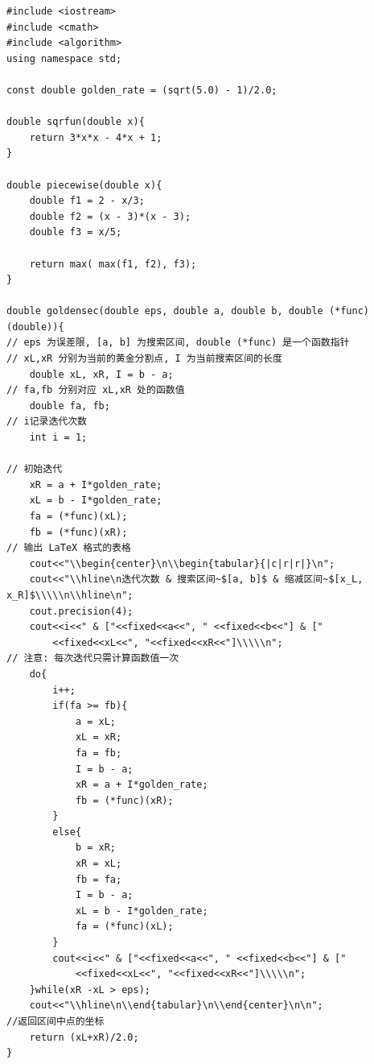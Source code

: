 \documentclass[a4paper,12pt]{article}
\begin{document}
\begin{CJK*}{UTF8}{gbsn}
\begin{lstlisting}[caption={黄金分割法}, label={goldensec}]
#include <iostream>
#include <cmath>
#include <algorithm>
using namespace std;

const double golden_rate = (sqrt(5.0) - 1)/2.0;

double sqrfun(double x){
    return 3*x*x - 4*x + 1;
}

double piecewise(double x){
    double f1 = 2 - x/3;
    double f2 = (x - 3)*(x - 3);
    double f3 = x/5;

    return max( max(f1, f2), f3);
}

double goldensec(double eps, double a, double b, double (*func)(double)){
// eps 为误差限, [a, b] 为搜索区间, double (*func) 是一个函数指针
// xL,xR 分别为当前的黄金分割点, I 为当前搜索区间的长度
    double xL, xR, I = b - a;
// fa,fb 分别对应 xL,xR 处的函数值
    double fa, fb;
// i记录迭代次数
    int i = 1;

// 初始迭代
    xR = a + I*golden_rate;
    xL = b - I*golden_rate;
    fa = (*func)(xL);
    fb = (*func)(xR);
// 输出 LaTeX 格式的表格
    cout<<"\\begin{center}\n\\begin{tabular}{|c|r|r|}\n";
    cout<<"\\hline\n迭代次数 & 搜索区间~$[a, b]$ & 缩减区间~$[x_L, x_R]$\\\\\n\\hline\n";
    cout.precision(4);
    cout<<i<<" & ["<<fixed<<a<<", " <<fixed<<b<<"] & ["
        <<fixed<<xL<<", "<<fixed<<xR<<"]\\\\\n";
// 注意: 每次迭代只需计算函数值一次
    do{
        i++;
        if(fa >= fb){
            a = xL;
            xL = xR;
            fa = fb;
            I = b - a;
            xR = a + I*golden_rate;
            fb = (*func)(xR);
        }
        else{
            b = xR;
            xR = xL;
            fb = fa;
            I = b - a;
            xL = b - I*golden_rate;
            fa = (*func)(xL);
        }
        cout<<i<<" & ["<<fixed<<a<<", " <<fixed<<b<<"] & ["
            <<fixed<<xL<<", "<<fixed<<xR<<"]\\\\\n";
    }while(xR -xL > eps);
    cout<<"\\hline\n\\end{tabular}\n\\end{center}\n\n";
//返回区间中点的坐标
    return (xL+xR)/2.0;
}


\end{lstlisting}
\end{CJK*}
\end{document}

